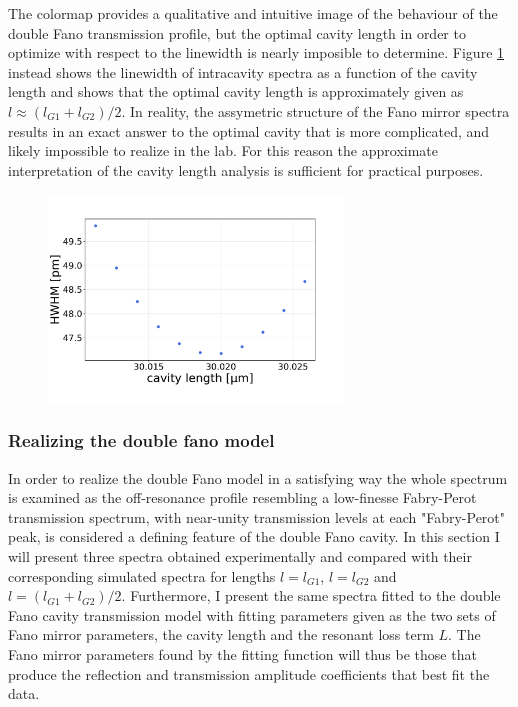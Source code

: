 The colormap provides a qualitative and intuitive image of the behaviour of the double Fano transmission profile, but the optimal cavity length in order to optimize with respect to the linewidth is nearly imposible to determine. Figure \ref{fig:G1/G2_lw_vs_cavity_length} instead shows the linewidth of intracavity spectra as a function of the cavity length and shows that the optimal cavity length is approximately given as $l \approx (l_{G1} + l_{G2})/2$. In reality, the assymetric structure of the Fano mirror spectra results in an exact answer to the optimal cavity that is more complicated, and likely impossible to realize in the lab. For this reason the approximate interpretation of the cavity length analysis is sufficient for practical purposes.

\begin{figure}[h!]
    \centering
    \includegraphics[width=0.7\textwidth]{figures/results/M3:M5/M3:M5_lw_vs_length.pdf}
    \caption{}
    \label{fig:G1/G2_lw_vs_cavity_length}
\end{figure}

\subsubsection{Realizing the double fano model}\label{sec:realizing_the_double_fano_model}

In order to realize the double Fano model in a satisfying way the whole spectrum is examined as the off-resonance profile resembling a low-finesse Fabry-Perot transmission spectrum, with near-unity transmission levels at each "Fabry-Perot" peak, is considered a defining feature of the double Fano cavity. In this section I will present three spectra obtained experimentally and compared with their corresponding simulated spectra for lengths $l=l_{G1}$, $l=l_{G2}$ and $l=(l_{G1} + l_{G2})/2$. Furthermore, I present the same spectra fitted to the double Fano cavity transmission model with fitting parameters given as the two sets of Fano mirror parameters, the cavity length and the resonant loss term $L$. The Fano mirror parameters found by the fitting function will thus be those that produce the reflection and transmission amplitude coefficients that best fit the data. 

